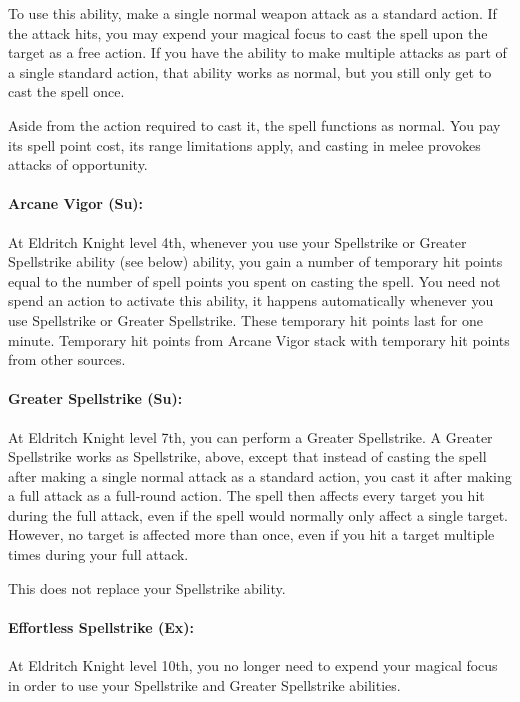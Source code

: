 To use this ability, make a single normal weapon attack as a standard action. If the attack hits, you may expend your magical focus to cast the spell upon the target as a free action. If you have the ability to make multiple attacks as part of a single standard action, that ability works as normal, but you still only get to cast the spell once.

Aside from the action required to cast it, the spell functions as normal. You pay its spell point cost, its range limitations apply, and casting in melee provokes attacks of opportunity.

\paragraph{Arcane Vigor (Su):}
At Eldritch Knight level 4th, whenever you use your Spellstrike or Greater Spellstrike ability (see below) ability, you gain a number of temporary hit points equal to the number of spell points you spent on casting the spell.
You need not spend an action to activate this ability, it happens automatically whenever you use Spellstrike or Greater Spellstrike.
These temporary hit points last for one minute.
Temporary hit points from Arcane Vigor stack with temporary hit points from other sources.

\paragraph{Greater Spellstrike (Su):}
At Eldritch Knight level 7th, you can perform a Greater Spellstrike.
A Greater Spellstrike works as Spellstrike, above, except that instead of casting the spell after making a single normal attack as a standard action, you cast it after making a full attack as a full-round action. The spell then affects every target you hit during the full attack, even if the spell would normally only affect a single target. However, no target is affected more than once, even if you hit a target multiple times during your full attack.

This does not replace your Spellstrike ability.

\paragraph{Effortless Spellstrike (Ex):}
At Eldritch Knight level 10th, you no longer need to expend your magical focus in order to use your Spellstrike and Greater Spellstrike abilities.
